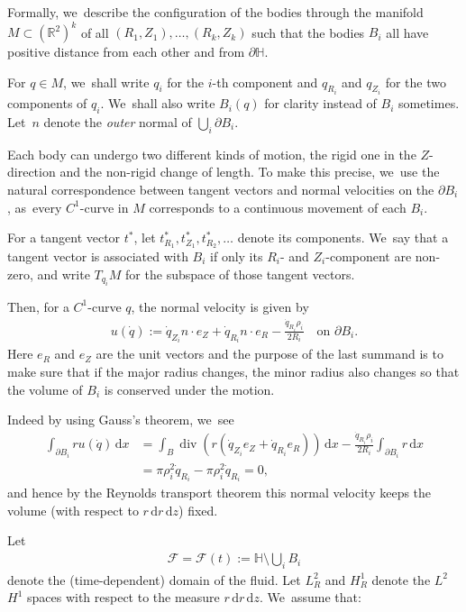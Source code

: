 \documentclass[JEP,XML,SOM,Unicode,published]{cedram}
\let\backslash\setminus
\theoremstyle{definition}
\renewcommand{\div}{\operatorname{div}}
\newcommand\R{\mathbb{R}}
\newcommand\dd{\,\mathrm{d}}
\newcommand\dx{\dd x}
\newcommand\dz{\dd z}
\newcommand\dr{\dd r}
\let\de\partial
\begin{document}
Formally, we~describe the configuration of the bodies through the manifold $M\subset (\R^2)^k$ of all $(R_1,Z_1),\dots, (R_k,Z_k)$ such that the bodies $B_i$ all have positive distance from each other and from $\de\mathbb{H}$.

For $q\in M$, we~shall write $q_i$ for the $i$-th component and $q_{R_i}$ and $q_{Z_i}$ for the two components of $q_i$. We~shall also write $B_i(q)$ for clarity instead of $B_i$ sometimes. Let~$n$ denote the \textit{outer} normal of $\bigcup_i\de B_i$.

Each body can undergo two different kinds of motion, the rigid one in the $Z$\nobreakdash-direction and the non-rigid change of length. To make this precise, we~use the natural correspondence between tangent vectors and normal velocities on the $\de B_i$, as~every $C^1$-curve in $M$ corresponds to a continuous movement of each $B_i$.

For a tangent vector $t^*$, let $t_{R_1}^*,t_{Z_1}^*,t_{R_2}^*,\dots$ denote its components. We~say that a tangent vector is associated with $B_i$ if only its $R_i$- and $Z_i$-component are non-zero, and write $T_{q_i}M$ for the subspace of those tangent vectors.

Then, for a $C^1$-curve $q$, the normal velocity is given by
\begin{align}
u(\dot{q}):=\dot{q}_{Z_i}n\cdot e_Z+\dot{q}_{R_i}n\cdot e_R-\frac{\dot{q}_{R_i}\rho_i}{2R_i}\quad\text{on $\de B_i$.}\label{normal velo}
\end{align}
Here $e_R$ and $e_Z$ are the unit vectors and the purpose of the last summand is to make sure that if the major radius changes, the minor radius also changes so that the volume of $B_i$ is conserved under the motion.

Indeed by using Gauss's theorem, we~see
\begin{equation}
\begin{aligned}
\int_{\de B_i}ru(\dot{q})\dx&=\int_B \div\left(r(\dot{q}_{Z_i}e_Z+\dot{q}_{R_i}e_R)\right)\dx-\frac{\dot{q}_{R_i}\rho_i}{2R_i}\int_{\de B_i} r\dx\\
&=\pi\rho_i^2\dot{q}_{R_i}-\pi \rho_i^2\dot{q}_{R_i}=0,\label{vol fix}
\end{aligned}
\end{equation}
and hence by the Reynolds transport theorem this normal velocity keeps the volume (with respect to $r\dr\dz$) fixed.

Let
\begin{align*}
\mathcal{F}=\mathcal{F}(t):=\mathbb{H}\backslash \bigcup_i B_i
\end{align*}
denote the (time-dependent) domain of the fluid. Let $L_R^2$ and $H_R^1$ denote the $L^2$ \resp $H^1$ spaces with respect to the measure $r\dr\dz$. We~assume that:
\end{document}
